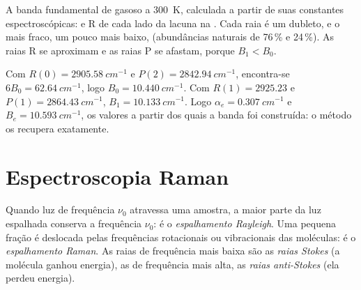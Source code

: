 \begin{omfigure}

{\small A banda fundamental de  gasoso a \qty{300}{K}, calculada a partir
de suas constantes espectroscópicas:  e R de cada lado da lacuna na
. Cada raia é um dubleto,  e o mais fraco, um pouco
mais baixo,  (abundâncias naturais de 76\,\% e 24\,\%). As raias R se
aproximam e as raias P se afastam, porque $B_1 < B_0$.}
\end{omfigure}

\begin{example}\label{ex:b3:rovibrational-spectroscopy:analysis}
Com $R(0) = \qty{2905.58}{cm^{-1}}$ e $P(2) = \qty{2842.94}{cm^{-1}}$, encontra-se
$6B_0 = \qty{62.64}{cm^{-1}}$, logo $B_0 = \qty{10.440}{cm^{-1}}$. Com $R(1) = 2925.23$ e $P(1) =
\qty{2864.43}{cm^{-1}}$, $B_1 = \qty{10.133}{cm^{-1}}$. Logo $\alpha_e = \qty{0.307}{cm^{-1}}$
e $B_e = \qty{10.593}{cm^{-1}}$, os valores a partir dos quais a banda foi construída:
o método os recupera exatamente.
\end{example}

\section{Espectroscopia Raman}

\begin{definition}\label{def:b3:rovibrational-spectroscopy:raman}
Quando luz de frequência $\nu_0$ atravessa uma amostra, a maior parte da luz
espalhada conserva a frequência $\nu_0$: é o \emph{espalhamento Rayleigh}.
Uma pequena fração é deslocada pelas frequências rotacionais ou vibracionais
das moléculas: é o \emph{espalhamento Raman}.
As raias de frequência mais baixa são as \emph{raias Stokes} (a
molécula ganhou energia), as de frequência mais alta, as \emph{raias
anti-Stokes} (ela perdeu energia).
\end{definition}

